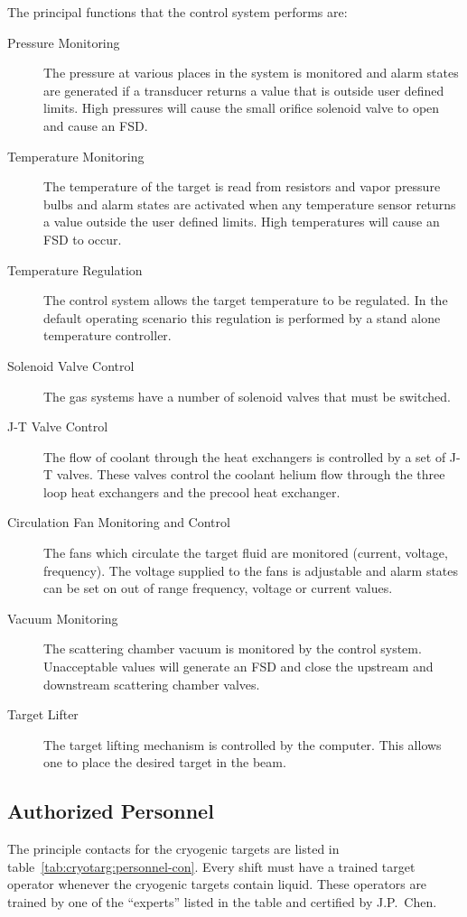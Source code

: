 {The principal functions that the control system performs are:
\begin{description}
\item[Pressure Monitoring] The pressure at various places in the system is
monitored and alarm states are generated if a transducer returns a value
that is outside user defined limits. High pressures will cause the
small orifice solenoid valve to open and cause an FSD.
\item[Temperature Monitoring] The temperature of the target
is read from resistors and vapor pressure bulbs and alarm states are
activated when any temperature sensor returns a value outside
the user defined limits. High temperatures will cause an FSD to occur.
\item[Temperature Regulation] The control system allows the target
temperature to be regulated. In the default operating scenario this regulation
is performed by a stand alone temperature controller.
\item[Solenoid Valve Control] The gas systems have a number of solenoid valves
that must be switched.
\item[J-T Valve Control] The flow of coolant through the heat exchangers
is controlled by a set of J-T valves. These valves control the coolant 
helium flow through the three loop heat exchangers and the precool heat
exchanger.
\item[Circulation Fan Monitoring and Control] The fans which circulate
the target fluid are monitored (current, voltage, frequency). The
voltage supplied to the fans is adjustable and alarm states can be set
on out of range frequency, voltage or current values.
\item[Vacuum Monitoring] The scattering chamber vacuum is monitored by
the control system. Unacceptable values will generate an FSD and close
the upstream and downstream  scattering chamber valves.
\item[Target Lifter] The target lifting mechanism is controlled by
the computer. This allows one to place the desired target in the beam.
\end{description}

\begin{safetyen}{10}{15}
\subsection{ Authorized Personnel}
\end{safetyen}

The principle contacts for the cryogenic targets are listed in 
table~\ref{tab:cryotarg:personnel-con}. Every shift must have a trained target
operator whenever the cryogenic targets contain liquid. These
operators are trained by one of the ``experts'' listed in the
table and certified by J.P.~Chen.

}

